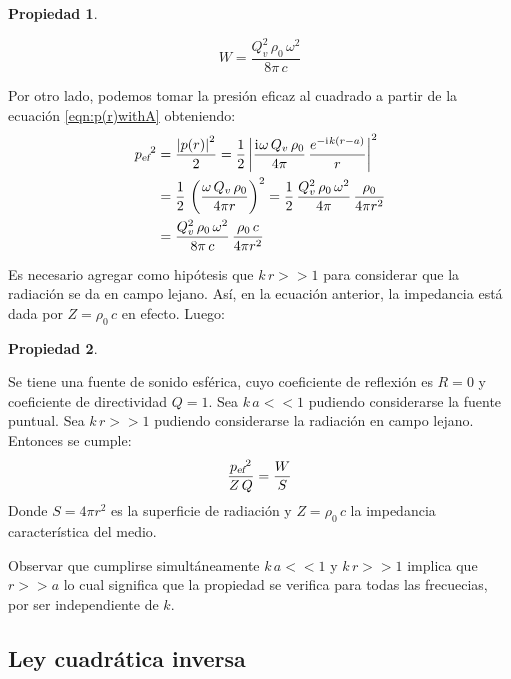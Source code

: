 \documentclass[a5paper,12pt,twoside]{book}
\newtheorem{prop}{{Propiedad}}[chapter]
\begin{document}
\begin{mdframed}[style=MyFrame1]
    \begin{prop}
    \end{prop}
    \begin{equation*}
        W = \frac{Q_v^2 \, \rho_0 \, \omega^2}{8\pi \,c}
    \end{equation*}
\end{mdframed}

Por otro lado, podemos tomar la presión eficaz al cuadrado a partir de la ecuación \ref{eqn:p(r)withA} obteniendo:
\begin{align*}
    {{{p}_\textsl{{ef}}}}^2 &= \frac{{\left| {p(r)} \right|}^2}{2}
    = \frac{1}{2} \, {\left| {\frac{\mathrm{i}\mkern1mu \omega \, Q_v \, \rho_0 }{4\pi} \, \frac{e^{-\mathrm{i}\mkern1mu k (r-a)}}{r}} \right|}^2
    \\
    &= \frac{1}{2} \, \left(\frac{\omega \, Q_v \, \rho_0 }{4\pi r}\right)^2
    = \frac{1}{2} \, \frac{Q_v^2 \, \rho_0 \, \omega^2}{4\pi} \, \frac{\rho_0}{4\pi r^2}
    \\
    &= \frac{Q_v^2 \, \rho_0 \, \omega^2}{8\pi \, c} \, \frac{\rho_0 \, c}{4\pi r^2}
\end{align*}

Es necesario agregar como hipótesis que $k\,r>>1$ para considerar que la radiación se da en campo lejano. Así, en la ecuación anterior, la impedancia está dada por $Z=\rho_0 \, c$ en efecto. Luego:

\begin{mdframed}[style=MyFrame1]
    \begin{prop}
        \label{prop:p^2/Z=W/S}
    \end{prop}
    Se tiene una fuente de sonido esférica, cuyo coeficiente de reflexión es $R=0$ y coeficiente de directividad $Q=1$. Sea $k\, a<<1$ pudiendo considerarse la fuente puntual. Sea $k\,r>>1$ pudiendo considerarse la radiación en campo lejano. Entonces se cumple:
    \begin{equation*}
        \frac{{{{p}_\textsl{{ef}}}}^2}{Z\,Q} = \frac{W}{S}
    \end{equation*}
    Donde $S=4\pi r^2$ es la superficie de radiación y $Z=\rho_0 \, c$ la impedancia característica del medio.
\end{mdframed}

Observar que cumplirse simultáneamente $k\, a<<1$ y $k\,r>>1$ implica que $r>>a$ lo cual significa que la propiedad se verifica para todas las frecuecias, por ser independiente de $k$.


\subsection{Ley cuadrática inversa}
\label{sec:inverseSquareLaw}
\end{document}
